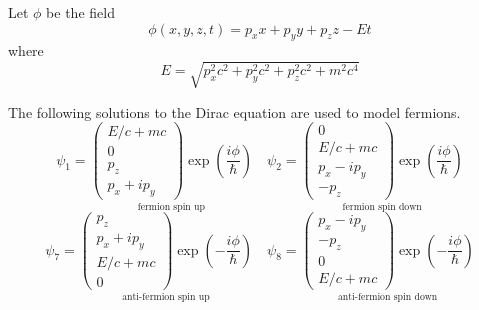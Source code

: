 \documentclass[12pt]{article}
\begin{document}
\noindent
Let $\phi$ be the field
\begin{equation*}
\phi(x,y,z,t)=p_xx+p_yy+p_zz-Et
\end{equation*}
where
\begin{equation*}
E=\sqrt{p_x^2c^2+p_y^2c^2+p_z^2c^2+m^2c^4}
\end{equation*}

\noindent
The following solutions to the Dirac equation are used to model fermions.
\begin{equation*}
\psi_1=\underset{\text{fermion spin up}}
{
\begin{pmatrix}E/c+mc\\0\\p_z\\p_x+ip_y\end{pmatrix}
\exp\left(\frac{i\phi}{\hbar}\right)
}
\quad
\psi_2=\underset{\text{fermion spin down}}
{
\begin{pmatrix}0\\E/c+mc\\p_x-ip_y\\-p_z\end{pmatrix}
\exp\left(\frac{i\phi}{\hbar}\right)
}
\end{equation*}
\begin{equation*}
\psi_7=\underset{\text{anti-fermion spin up}}
{
\begin{pmatrix}p_z\\p_x+ip_y\\E/c+mc\\0\end{pmatrix}
\exp\left(-\frac{i\phi}{\hbar}\right)
}
\quad
\psi_8=\underset{\text{anti-fermion spin down}}
{
\begin{pmatrix}p_x-ip_y\\-p_z\\0\\E/c+mc\end{pmatrix}
\exp\left(-\frac{i\phi}{\hbar}\right)
}
\end{equation*}
\end{document}
